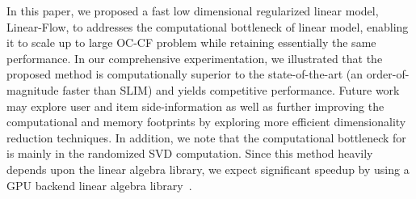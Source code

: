 
In this paper, we proposed a fast low dimensional regularized linear model, Linear-Flow, to addresses the computational bottleneck of linear model, enabling it to scale up to large OC-CF problem while retaining essentially the same performance. In our comprehensive experimentation, we illustrated that the proposed method is computationally superior to the state-of-the-art (an order-of-magnitude faster than SLIM) and yields competitive performance. Future work may explore user and item side-information as well as further improving the computational and memory footprints by exploring more efficient dimensionality reduction techniques. 
In addition, we note that the computational bottleneck for \LinearLow is mainly in the randomized SVD computation. Since this method heavily depends upon the linear algebra library, we expect significant speedup by using a GPU backend linear algebra library~\citep{Voronin:GPURSVD}. 

